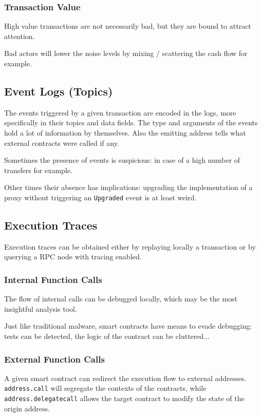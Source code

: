 \subsubsection{Transaction Value}

High value transactions are not necessarily bad, but they are bound to attract attention.

Bad actors will lower the noise levels by mixing / scattering the cash flow for example.

\subsection{Event Logs (Topics)}

The events triggered by a given transaction are encoded in the logs, more specifically in their topics and data fields.
The type and arguments of the events hold a lot of information by themselves. Also the emitting address tells what external contracts were called if any.

Sometimes the presence of events is suspicious: in case of a high number of transfers for example.

Other times their absence has implications: upgrading the implementation of a proxy without triggering an \lstinline{Upgraded} event is at least weird.

\subsection{Execution Traces}

Execution traces can be obtained either by replaying locally a transaction or by querying a RPC node with tracing enabled.

\subsubsection{Internal Function Calls}

The flow of internal calls can be debugged locally, which may be the most insightful analysis tool.

Just like traditional malware, smart contracts have means to evade debugging: tests can be detected, the logic of the contract can be cluttered...

\subsubsection{External Function Calls}

A given smart contract can redirect the execution flow to external addresses.
\lstinline[language=Solidity]{address.call} will segregate the contexts of the contracts, while \lstinline[language=Solidity]{address.delegatecall} allows the target contract to modify the state of the origin address.

